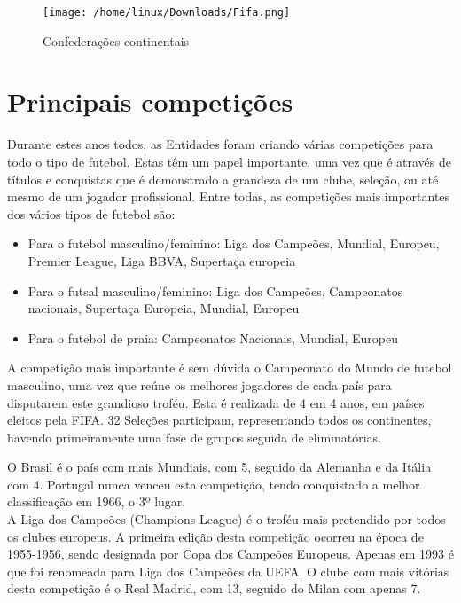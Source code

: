 \documentclass[a4paper,12pt]{report}
\begin{document}
\begin{figure}[!htp]
\centering 
\texttt{[image: /home/linux/Downloads/Fifa.png]}
\caption{Confederações continentais}
\end{figure} 

\section{Principais competições}
\label{Principais Competições}

Durante estes anos todos, as Entidades foram criando várias competições para todo o tipo de futebol. Estas têm um papel importante, uma vez que é através de títulos e conquistas que é demonstrado a grandeza de um clube, seleção, ou até mesmo de um jogador profissional. Entre todas, as competições mais importantes dos vários tipos de futebol são: 
\begin{itemize}
\item  Para o futebol masculino/feminino: Liga dos Campeões, Mundial, Europeu, Premier League, Liga BBVA, Supertaça europeia

\item Para o futsal masculino/feminino: Liga dos Campeões, Campeonatos nacionais, Supertaça Europeia, Mundial, Europeu 

\item Para o futebol de praia: Campeonatos Nacionais, Mundial, Europeu
\end{itemize}

A competição mais importante é sem dúvida o Campeonato do Mundo de futebol masculino, uma vez que reúne os melhores jogadores de cada país para disputarem este grandioso troféu. Esta é realizada de 4 em 4 anos, em países eleitos pela FIFA. 32 Seleções participam, representando todos os continentes, havendo primeiramente uma fase de grupos seguida de eliminatórias. \newpage

O Brasil é o país com mais Mundiais, com 5, seguido da Alemanha e da Itália com 4. Portugal nunca venceu esta competição, tendo conquistado a melhor classificação em 1966, o 3º lugar. \\

A Liga dos Campeões (Champions League) é o troféu mais pretendido por todos os clubes europeus. A primeira edição desta competição ocorreu na época de 1955-1956, sendo designada por Copa dos Campeões Europeus. Apenas em 1993 é que foi renomeada para Liga dos Campeões da UEFA.
 O clube com mais vitórias desta competição é o Real Madrid, com 13, seguido do Milan com apenas 7.
 
\end{document}
